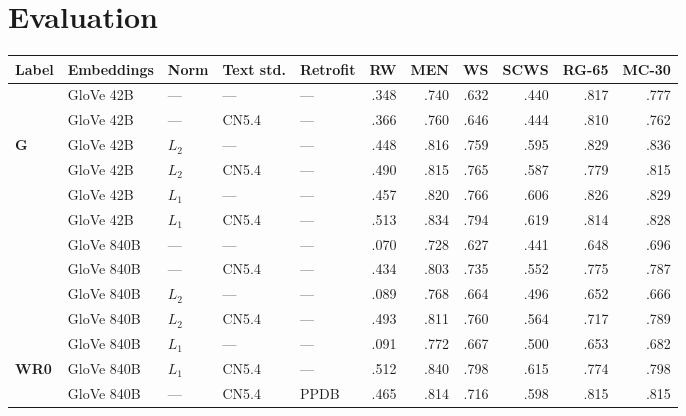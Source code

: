 \documentclass[11pt,letterpaper]{article}
\begin{document}
\section{Evaluation}

\begin{table*}[t]
\centering
\begin{tabular}{lllllrrrrrr}
\toprule
Label  &Embeddings   & Norm  & Text std. & Retrofit &       RW & MEN      &        WS &      SCWS &    RG-65 &    MC-30 \\
\midrule
       &GloVe 42B    & ---   & ---       & ---      &     .348 &     .740 &      .632 &      .440 &     .817 &     .777 \\
       &GloVe 42B    & ---   & CN5.4     & ---      &     .366 &     .760 &      .646 &      .444 &     .810 &     .762 \\
\bf G  &GloVe 42B    & $L_2$ & ---       & ---      &     .448 &     .816 &      .759 &      .595 &     .829 &     .836 \\
       &GloVe 42B    & $L_2$ & CN5.4     & ---      &     .490 &     .815 &      .765 &      .587 &     .779 &     .815 \\
       &GloVe 42B    & $L_1$ & ---       & ---      &     .457 &     .820 &      .766 &      .606 &     .826 &     .829 \\
       &GloVe 42B    & $L_1$ & CN5.4     & ---      &     .513 &     .834 &      .794 &      .619 &     .814 &     .828 \\
\midrule
       &GloVe 840B   & ---   & ---       & ---      &     .070 &     .728 &      .627 &      .441 &     .648 &     .696 \\
       &GloVe 840B   & ---   & CN5.4     & ---      &     .434 &     .803 &      .735 &      .552 &     .775 &     .787 \\
       &GloVe 840B   & $L_2$ & ---       & ---      &     .089 &     .768 &      .664 &      .496 &     .652 &     .666 \\
       &GloVe 840B   & $L_2$ & CN5.4     & ---      &     .493 &     .811 &      .760 &      .564 &     .717 &     .789 \\
       &GloVe 840B   & $L_1$ & ---       & ---      &     .091 &     .772 &      .667 &      .500 &     .653 &     .682 \\
\bf WR0&GloVe 840B   & $L_1$ & CN5.4     & ---      &     .512 &     .840 &      .798 &      .615 &     .774 &     .798 \\
\midrule
       &GloVe 840B   & ---   & CN5.4     & PPDB     &     .465 &     .814 &      .716 &      .598 &     .815 &     .815 \\

\end{tabular}
\end{table*}
\end{document}
